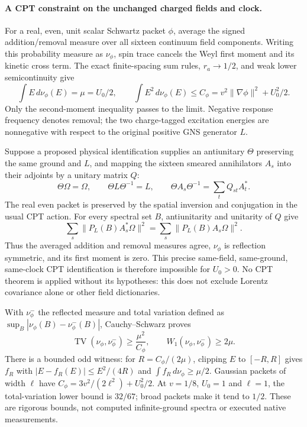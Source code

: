 \paragraph{A CPT constraint on the unchanged charged fields and clock.}
For a real, even, unit scalar Schwartz packet $\phi$, average the signed
addition/removal measure over all sixteen continuum field components.
Writing this probability measure as $\nu_\phi$, spin trace cancels the
Weyl first moment and its kinetic cross term. The exact finite-spacing
sum rules, $r_a\to1/2$, and weak lower semicontinuity give
\[
 \int E\,d\nu_\phi(E)=\mu=U_0/2,\qquad
 \int E^2\,d\nu_\phi(E)\le C_\phi
 =v^2\|\nabla\phi\|^2+U_0^2/2.
\]
Only the second-moment inequality passes to the limit. Negative response
frequency denotes removal; the two charge-tagged excitation energies
are nonnegative with respect to the original positive GNS generator $L$.

Suppose a proposed physical identification supplies an antiunitary
$\Theta$ preserving the same ground and $L$, and mapping the sixteen
smeared annihilators $A_s$ into their adjoints by a unitary matrix $Q$:
\[
 \Theta\Omega=\Omega,\qquad \Theta L\Theta^{-1}=L,\qquad
 \Theta A_s\Theta^{-1}=\sum_t Q_{st}A_t^*.
\]
The real even packet is preserved by the spatial inversion and conjugation
in the usual CPT action. For every spectral set $B$, antiunitarity and
unitarity of $Q$ give
\[
 \sum_s\|P_L(B)A_s^*\Omega\|^2
 =\sum_s\|P_L(B)A_s\Omega\|^2.
\]
Thus the averaged addition and removal measures agree, $\nu_\phi$ is
reflection symmetric, and its first moment is zero. This precise
same-field, same-ground, same-clock CPT identification is therefore
impossible for $U_0>0$. No CPT theorem is applied without its hypotheses:
this does not exclude Lorentz covariance alone or other field dictionaries.

With $\nu_\phi^-$ the reflected measure and total variation defined as
$\sup_B|\nu_\phi(B)-\nu_\phi^-(B)|$, Cauchy--Schwarz proves
\[
 \operatorname{TV}(\nu_\phi,\nu_\phi^-)
 \ge\frac{\mu^2}{C_\phi},\qquad
 W_1(\nu_\phi,\nu_\phi^-)\ge2\mu.
\]
There is a bounded odd witness: for $R=C_\phi/(2\mu)$, clipping $E$ to
$[-R,R]$ gives $f_R$ with $|E-f_R(E)|\le E^2/(4R)$ and
$\int f_R\,d\nu_\phi\ge\mu/2$. Gaussian packets of width $\ell$
have $C_\phi=3v^2/(2\ell^2)+U_0^2/2$. At $v=1/8$, $U_0=1$ and
$\ell=1$, the total-variation lower bound is $32/67$; broad packets make
it tend to $1/2$. These are rigorous bounds, not computed infinite-ground
spectra or executed native measurements.


